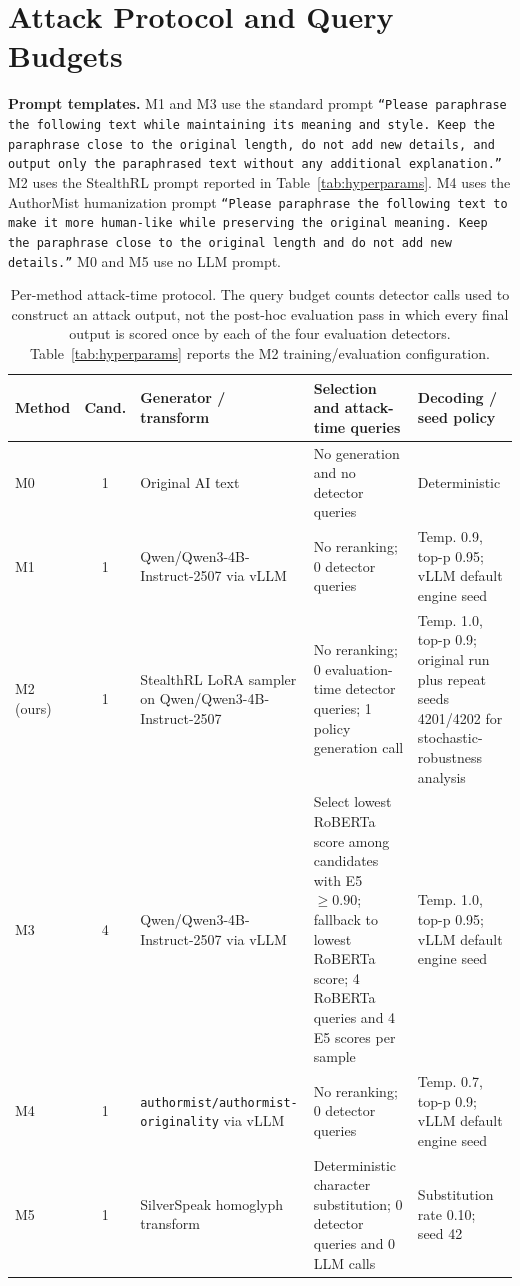 \documentclass[11pt]{article}
\begin{document}
\FloatBarrier
\section{Attack Protocol and Query Budgets}
\label{app:protocol}

\noindent\textbf{Prompt templates.} M1 and M3 use the standard prompt \texttt{``Please paraphrase the following text while maintaining its meaning and style. Keep the paraphrase close to the original length, do not add new details, and output only the paraphrased text without any additional explanation.''} M2 uses the StealthRL prompt reported in Table~\ref{tab:hyperparams}. M4 uses the AuthorMist humanization prompt \texttt{``Please paraphrase the following text to make it more human-like while preserving the original meaning. Keep the paraphrase close to the original length and do not add new details.''} M0 and M5 use no LLM prompt.

\begin{table}[H]
\centering
\scriptsize
\setlength{\tabcolsep}{2pt}
\begin{tabularx}{\linewidth}{l c >{\raggedright\arraybackslash}X >{\raggedright\arraybackslash}X >{\raggedright\arraybackslash}X}
\toprule
\textbf{Method} & \textbf{Cand.} & \textbf{Generator / transform} & \textbf{Selection and attack-time queries} & \textbf{Decoding / seed policy} \\
\midrule
M0 & 1 & Original AI text & No generation and no detector queries & Deterministic \\
M1 & 1 & Qwen/\allowbreak Qwen3-4B-Instruct-2507 via vLLM & No reranking; 0 detector queries & Temp. 0.9, top-p 0.95; vLLM default engine seed \\
M2 (ours) & 1 & StealthRL LoRA sampler on Qwen/\allowbreak Qwen3-4B-Instruct-2507 & No reranking; 0 evaluation-time detector queries; 1 policy generation call & Temp. 1.0, top-p 0.9; original run plus repeat seeds 4201/4202 for stochastic-robustness analysis \\
M3 & 4 & Qwen/\allowbreak Qwen3-4B-Instruct-2507 via vLLM & Select lowest RoBERTa score among candidates with E5 $\geq 0.90$; fallback to lowest RoBERTa score; 4 RoBERTa queries and 4 E5 scores per sample & Temp. 1.0, top-p 0.95; vLLM default engine seed \\
M4 & 1 & \texttt{authormist/}\allowbreak\texttt{authormist-originality} via vLLM & No reranking; 0 detector queries & Temp. 0.7, top-p 0.9; vLLM default engine seed \\
M5 & 1 & SilverSpeak homoglyph transform & Deterministic character substitution; 0 detector queries and 0 LLM calls & Substitution rate 0.10; seed 42 \\
\bottomrule
\end{tabularx}
\caption{Per-method attack-time protocol. The query budget counts detector calls used to construct an attack output, not the post-hoc evaluation pass in which every final output is scored once by each of the four evaluation detectors. Table~\ref{tab:hyperparams} reports the M2 training/evaluation configuration.}
\label{tab:attack_protocol}
\end{table}
\end{document}
